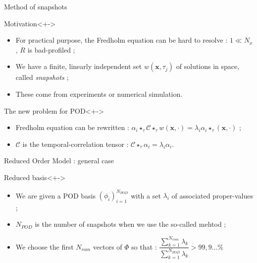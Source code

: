 \begin{frame}{Method of snapshots}
%
\begin{block}{Motivation}<+->
\begin{itemize}
\item<+-> For practical purpose, the Fredholm equation can be hard to resolve : $1\ll N_x$, $R$ is bad-profiled ;
\item<+-> We have a finite, linearly independent set $w(\mathbf{x},\tau_j)$ of solutions in space, called \emph{snapshots} ;
\item<+-> These come from experiments or numerical simulation.
\end{itemize}
\end{block}
%
\begin{block}{The new problem for POD}<+->
\begin{itemize}
\item<+-> Fredholm equation can be rewritten : $\alpha_i\star_{\tau}\mathcal{C}\star_{\tau}w(\mathbf{x},\cdot)=\lambda_i\alpha_i\star_{\tau}(\mathbf{x},\cdot)$ ;
\item<+-> $\mathcal{C}$ is the temporal-correlation tensor : $\mathcal{C}\star_{\tau}\alpha_i\mathbf=\lambda_i\alpha_i$.
\end{itemize}
\end{block}
%
\end{frame}

\begin{frame}{Reduced Order Model : general case}
%
\begin{block}{Reduced basis}<+->
\begin{itemize}
\item<+-> We are given a POD basis $(\phi_i)_{i=1}^{N_{POD}}$ with a set $\lambda_i$ of associated proper-values ;
\item<+-> $N_{POD}$ is the number of snapshots when we use the so-called mehtod ;
\item<+-> We choose the first $N_{rom}$ vectors of $\Phi$ so that : $\dfrac{\sum\limits_{k=1}^{N_{rom}}\lambda_k}{\sum\limits_{k=1}^{N_{POD}}\lambda_k} >99,9\dots \%$
\end{itemize}
\end{block}
%
\end{frame}

